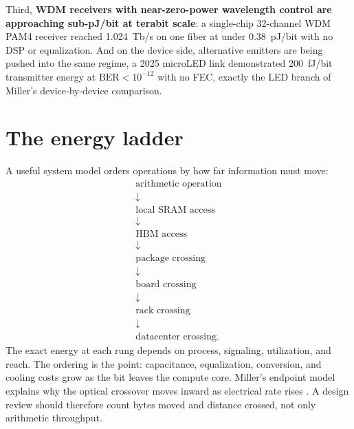 Third, \textbf{WDM receivers with near-zero-power wavelength control are
approaching sub-pJ/bit at terabit scale}: a single-chip 32-channel WDM PAM4
receiver reached \SI{1.024}{Tb/s} on one fiber at under \SI{0.38}{pJ/bit} with no
DSP or equalization. And
on the device side, alternative emitters are being pushed into the same regime, a
2025 microLED link demonstrated \SI{200}{fJ/bit} transmitter energy at
$\text{BER} < 10^{-12}$ with no FEC, exactly the LED branch of Miller's
device-by-device comparison.


\section{The energy ladder}
\label{sec:energy-ladder}

A useful system model orders operations by how far information must move:
\[
\begin{array}{c}
\text{arithmetic operation} \\
\downarrow \\
\text{local SRAM access} \\
\downarrow \\
\text{HBM access} \\
\downarrow \\
\text{package crossing} \\
\downarrow \\
\text{board crossing} \\
\downarrow \\
\text{rack crossing} \\
\downarrow \\
\text{datacenter crossing.}
\end{array}
\]
The exact energy at each rung depends on process, signaling, utilization, and
reach. The ordering is the point: capacitance, equalization, conversion, and
cooling costs grow as the bit leaves the compute core. Miller's endpoint model
explains why the optical crossover moves inward as electrical rate rises
\cite{miller2009,miller2017}. A design review should therefore count bytes moved
and distance crossed, not only arithmetic throughput.

